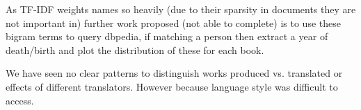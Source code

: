 \documentclass[a4paper,10pt, twocolumn]{article}
\begin{document}
As TF-IDF weights names so heavily (due to their sparsity in documents they are not important in) further work proposed (not able to complete) is to use these bigram terms to query dbpedia, if matching a person then extract a year of death/birth and plot the distribution of these for each book.

We have seen no clear patterns to distinguish works produced vs. translated or effects of different translators. However because language style was difficult to access. 


\end{document}
